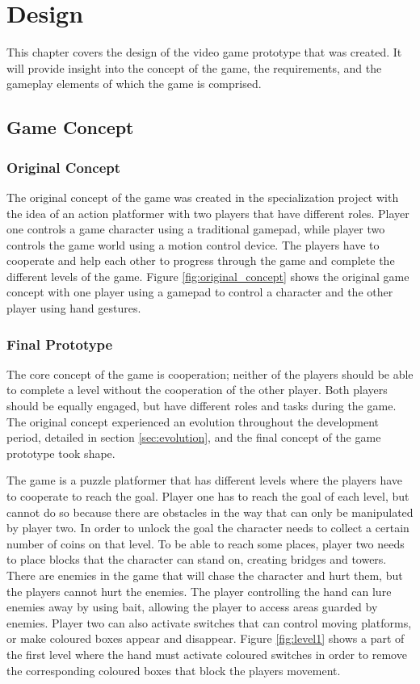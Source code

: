 \chapter{Design}
This chapter covers the design of the video game prototype that was created. It will provide insight into the concept of the game, the requirements, and the gameplay elements of which the game is comprised.


\section{Game Concept}
\subsection{Original Concept}
The original concept of the game was created in the specialization project with the idea of an action platformer with two players that have different roles. Player one controls a game character using a traditional gamepad, while player two controls the game world using a motion control device. The players have to cooperate and help each other to progress through the game and complete the different levels of the game. Figure \ref{fig:original_concept} shows the original game concept with one player using a gamepad to control a character and the other player using hand gestures.



\subsection{Final Prototype}
The core concept of the game is cooperation; neither of the players should be able to complete a level without the cooperation of the other player. Both players should be equally engaged, but have different roles and tasks during the game. The original concept experienced an evolution throughout the development period, detailed in section \ref{sec:evolution}, and the final concept of the game prototype took shape. 

The game is a puzzle platformer that has different levels where the players have to cooperate to reach the goal. Player one has to reach the goal of each level, but cannot do so because there are obstacles in the way that can only be manipulated by player two. In order to unlock the goal the character needs to collect a certain number of coins on that level. To be able to reach some places, player two needs to place blocks that the character can stand on, creating bridges and towers. There are enemies in the game that will chase the character and hurt them, but the players cannot hurt the enemies. The player controlling the hand can lure enemies away by using bait, allowing the player to access areas guarded by enemies. Player two can also activate switches that can control moving platforms, or make coloured boxes appear and disappear. Figure \ref{fig:level1} shows a part of the first level where the hand must activate coloured switches in order to remove the corresponding coloured boxes that block the players movement.

